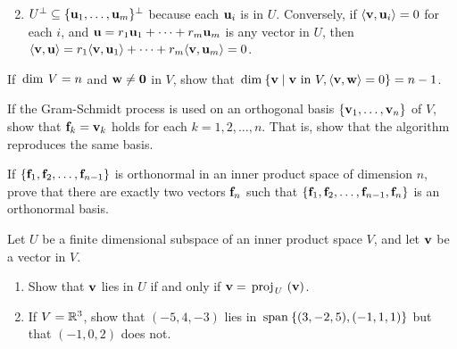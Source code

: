 \begin{multicols}{2}
\begin{ex}
\begin{enumerate}[label={\alph*.}]
\end{enumerate}
\begin{sol}
\begin{enumerate}[label={\alph*.}]
\setcounter{enumi}{1}
\item  $U^{\perp} \subseteq \{\textbf{u}_{1}, \dots, \textbf{u}_{m}\}^{\perp}$ because each $\textbf{u}_{i}$ is in $U$. Conversely, if $\langle \textbf{v}, \textbf{u}_i \rangle = 0$ for each $i$, and $\textbf{u} = r_{1}\textbf{u}_{1} + \dots + r_{m}\textbf{u}_{m}$ is any vector in $U$, then $\langle \textbf{v}, \textbf{u} \rangle = r_1 \langle \textbf{v}, \textbf{u}_1 \rangle + \dots + r_m \langle \textbf{v}, \textbf{u}_m \rangle = 0$.

\end{enumerate}
\end{sol}
\end{ex}

\begin{ex}
If $\thinspace\operatorname{dim\medspace} V = n$ and $\textbf{w} \neq \textbf{0}$ in $V$, show that
$\thinspace\operatorname{dim\medspace} \{\textbf{v} \mid \textbf{v} \mbox{ in } V, \langle\textbf{v}, \textbf{w}\rangle = 0\} = n - 1$.
\end{ex}

\begin{ex}
If the Gram-Schmidt process is used on an orthogonal basis $\{\textbf{v}_{1}, \dots, \textbf{v}_{n}\}$ of $V$, show that $\textbf{f}_{k} = \textbf{v}_{k}$ holds for each $k = 1, 2, \dots, n$. That is, show that the algorithm reproduces the same basis.
\end{ex}

\begin{ex}
If $\{\textbf{f}_{1}, \textbf{f}_{2}, \dots, \textbf{f}_{n-1}\}$ is orthonormal in an inner product space of dimension $n$, prove that there are exactly two vectors $\textbf{f}_{n}$ such that $\{\textbf{f}_{1}, \textbf{f}_{2}, \dots, \textbf{f}_{n-1}, \textbf{f}_{n}\}$ is an orthonormal basis.
\end{ex}

\begin{ex}
Let $U$ be a finite dimensional subspace of an inner product space $V$, and let $\textbf{v}$ be a vector in $V$.

\begin{enumerate}[label={\alph*.}]
\item Show that $\textbf{v}$ lies in $U$ if and only if $\textbf{v} = \thinspace\operatorname{proj\medspace}_{\!U}\,{(\textbf{v})}$.

\item If $V = \mathbb{R}^3$, show that $(-5, 4, -3)$ lies in $\thinspace\operatorname{span\medspace}\{(3, -2, 5), (-1, 1, 1)\}$ but that $(-1, 0, 2)$ does not.


\end{enumerate}
\end{ex}
\end{multicols}
